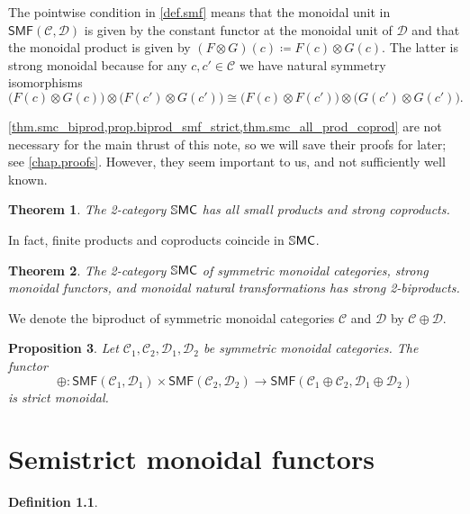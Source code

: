 \documentclass[11pt, oneside, article]{memoir}
\theoremstyle{plain}
\newtheorem{theorem}{Theorem}[chapter]
\newtheorem{proposition}[theorem]{Proposition}
\theoremstyle{definition}
\newtheorem{definition}[theorem]{Definition}
\theoremstyle{remark}
\newcommand{\cat}[1]{\mathcal{#1}}%
\newcommand{\Cat}[1]{{\mathsf{#1}}}%
\newcommand{\CCat}[1]{\mathbb{\StrLeft{#1}{1}}\Cat{\StrGobbleLeft{#1}{1}}}%
\newcommand{\smf}{\Cat{SMF}}
\newcommand{\ssmc}{\CCat{SMC}}
\begin{document}
The pointwise condition in \cref{def.smf} means that the monoidal unit in $\smf(\cat{C},\cat{D})$ is given by the constant functor at the monoidal unit of $\cat{D}$ and that the monoidal product is given by $(F\otimes G)(c)\coloneqq F(c)\otimes G(c).$ The latter is strong monoidal because for any $c,c'\in\cat{C}$ we have natural symmetry isomorphisms
\[
	\big(F(c)\otimes G(c)\big)\otimes\big(F(c')\otimes G(c')\big)
	\cong
	\big(F(c)\otimes F(c')\big)\otimes\big(G(c')\otimes G(c')\big).
\]

\cref{thm.smc_biprod,prop.biprod_smf_strict,thm.smc_all_prod_coprod} are not necessary for the main thrust of this note, so we will save their proofs for later; see \cref{chap.proofs}. %
However, they seem important to us, and not sufficiently well known. 

\begin{theorem}\label{thm.smc_all_prod_coprod}
The 2-category $\ssmc$ has all small products and strong coproducts.
\end{theorem}

In fact, finite products and coproducts coincide in $\ssmc$.

\begin{theorem}\label{thm.smc_biprod}
The 2-category $\ssmc$ of symmetric monoidal categories, strong monoidal functors, and monoidal natural transformations has strong 2-biproducts.
\end{theorem}

We denote the biproduct of symmetric monoidal categories $\cat{C}$ and $\cat{D}$ by $\cat{C}\oplus\cat{D}$.

\begin{proposition}\label{prop.biprod_smf_strict}
Let $\cat{C}_1,\cat{C}_2,\cat{D}_1,\cat{D}_2$ be symmetric monoidal categories. The functor
\[
  \oplus\colon
  \smf(\cat{C}_1,\cat{D}_1)\times\smf(\cat{C}_2,\cat{D}_2)
  \to
  \smf(\cat{C}_1\oplus\cat{C}_2,\cat{D}_1\oplus\cat{D}_2)
\]
is strict monoidal.
\end{proposition}

\chapter{Semistrict monoidal functors}

\begin{definition} \label{def.semistrict}
\end{definition}
\end{document}
